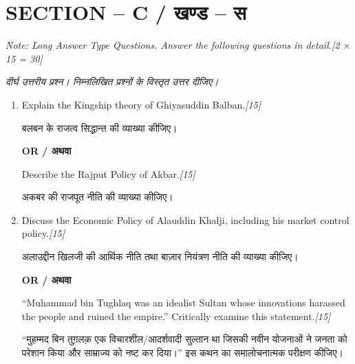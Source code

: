 \documentclass[11pt,a4paper]{article}
\newcommand{\pts}[1]{\hfill \textit{[#1]}}
\begin{document}
\bigskip

\section*{SECTION -- C / खण्ड -- स}
\noindent \textit{Note: Long Answer Type Questions. Answer the following questions in detail.}\pts{2 $\times$ 15 = 30}

\noindent \textit{दीर्घ उत्तरीय प्रश्न। निम्नलिखित प्रश्नों के विस्तृत उत्तर दीजिए।}

\begin{enumerate}[label=\textbf{\arabic*.},leftmargin=*,start=5,itemsep=14pt]

  \item Explain the Kingship theory of Ghiyasuddin Balban.\pts{15}
  
  बलबन के राजत्व सिद्धान्त की व्याख्या कीजिए।

  \begin{center}\textbf{OR / अथवा}\end{center}

  Describe the Rajput Policy of Akbar.\pts{15}
  
  अकबर की राजपूत नीति की व्याख्या कीजिए।

  \item Discuss the Economic Policy of Alauddin Khalji, including his market control policy.\pts{15}
  
  अलाउद्दीन खिलजी की आर्थिक नीति तथा बाज़ार नियंत्रण नीति की व्याख्या कीजिए।

  \begin{center}\textbf{OR / अथवा}\end{center}

  ``Muhammad bin Tughlaq was an idealist Sultan whose innovations harassed the people and ruined the empire.'' Critically examine this statement.\pts{15}
  
  ``मुहम्मद बिन तुग़लक़ एक विचारशील/आदर्शवादी सुल्तान था जिसकी नवीन योजनाओं ने जनता को परेशान किया और साम्राज्य को नष्ट कर दिया।'' इस कथन का समालोचनात्मक परीक्षण कीजिए।

\end{enumerate}
\end{document}
